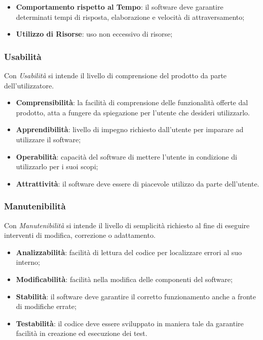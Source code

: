 \begin{itemize}
	\item \textbf{Comportamento rispetto al Tempo}: il software deve garantire determinati tempi di risposta, elaborazione e velocità di attraversamento;
	\item \textbf{Utilizzo di Risorse}: uso non eccessivo di risorse;
\end{itemize}

\subsubsection{Usabilità}

Con \textit{Usabilità} si intende il livello di comprensione del prodotto da parte dell'utilizzatore.

\begin{itemize}
	\item \textbf{Comprensibilità}: la facilità di comprensione delle funzionalità offerte dal prodotto, atta a fungere da spiegazione per l'utente che desideri utilizzarlo. 
	\item \textbf{Apprendibilità}: livello di impegno richiesto dall'utente per imparare ad utilizzare il software;
	\item \textbf{Operabilità}: capacità del software di mettere l'utente in condizione di utilizzarlo per i suoi scopi; 
	\item \textbf{Attrattività}: il software deve essere di piacevole utilizzo da parte dell'utente.
\end{itemize}

\subsubsection{Manutenibilità}

Con \textit{Manutenibilità} si intende il livello di semplicità richiesto al fine di eseguire interventi di modifica, correzione o adattamento.

\begin{itemize}
	\item \textbf{Analizzabilità}: facilità di lettura del codice per localizzare errori al suo interno; 
	\item \textbf{Modificabilità}: facilità nella modifica delle componenti del software;
	\item \textbf{Stabilità}: il software deve garantire il corretto funzionamento anche a fronte di modifiche errate;
	\item \textbf{Testabilità}: il codice deve essere sviluppato in maniera tale da garantire facilità in creazione ed esecuzione dei test.
\end{itemize}

